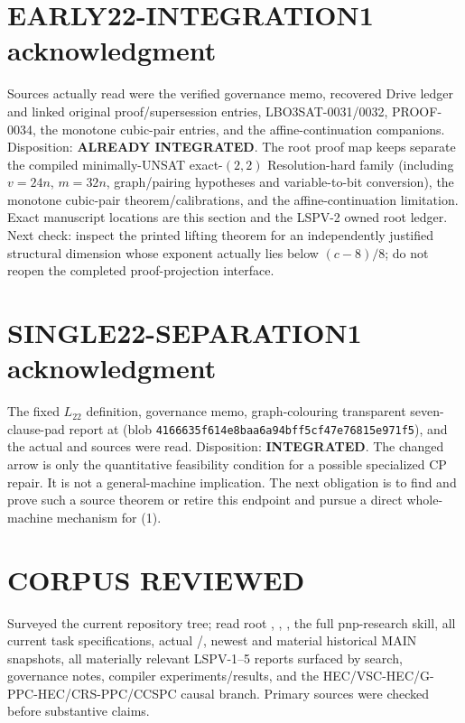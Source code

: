 \documentclass[11pt]{article}
\newcommand{\Ltwo}{L_{22}}
\begin{document}
\section{EARLY22-INTEGRATION1 acknowledgment}
Sources actually read were the verified governance memo, recovered Drive
ledger and linked original proof/supersession entries, LBO3SAT-0031/0032,
PROOF-0034, the monotone cubic-pair entries, and the affine-continuation
companions.  Disposition: \textbf{ALREADY INTEGRATED}.  The root proof map
keeps separate the compiled minimally-UNSAT exact-\((2,2)\) Resolution-hard
family (including \(v=24n\), \(m=32n\), graph/pairing hypotheses and
variable-to-bit conversion), the monotone cubic-pair theorem/calibrations,
and the affine-continuation limitation.  Exact manuscript locations are this
section and the LSPV-2 owned root ledger.  Next check: inspect the printed
lifting theorem for an independently justified structural dimension whose
exponent actually lies below \((c-8)/8\); do not reopen the completed
proof-projection interface.

\section{SINGLE22-SEPARATION1 acknowledgment}
The fixed \(\Ltwo\) definition, governance memo, graph-colouring transparent
seven-clause-pad report at
(blob \texttt{4166635f614e8baa6a94bff5cf47e76815e971f5}), and the actual
 and
 sources were read.
Disposition: \textbf{INTEGRATED}.  The changed arrow is only the quantitative
feasibility condition for a possible specialized CP repair.  It is not a
general-machine implication.  The next obligation is to find and prove such
a source theorem or retire this endpoint and pursue a direct whole-machine
mechanism for (1).

\section{CORPUS REVIEWED}
Surveyed the current repository tree; read root ,
, , the full pnp-research skill, all current
task specifications, actual /, newest and
material historical MAIN snapshots, all materially relevant LSPV-1--5
reports surfaced by search, governance notes, compiler experiments/results,
and the HEC/VSC-HEC/G-PPC-HEC/CRS-PPC/CCSPC causal branch.  Primary sources
\cite{derezende,lauria,rothvoss} were checked before substantive claims.
\end{document}
